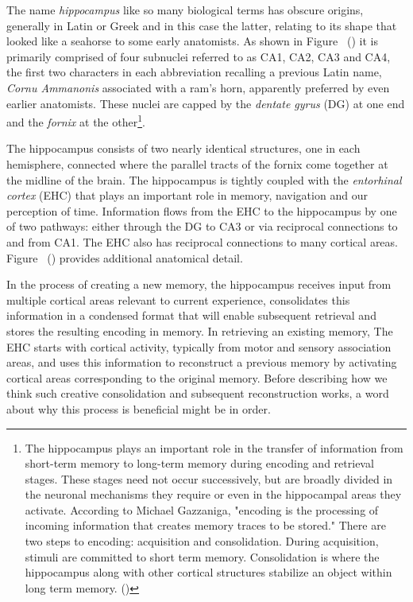 The name {\it{hippocampus}} like so many biological terms has obscure origins, generally in Latin or Greek and in this case the latter, relating to its shape that looked like a seahorse to some early anatomists. As shown in Figure~{} ({}) it is primarily comprised of four subnuclei referred to as CA1, CA2, CA3 and CA4, the first two characters in each abbreviation recalling a previous Latin name, {\it{Cornu Ammanonis}} associated with a ram's horn, apparently preferred by even earlier anatomists. These nuclei are capped by the {\it{dentate gyrus}} (DG) at one end and the {\it{fornix}} at the other\footnote{%
%
  The hippocampus plays an important role in the transfer of information from short-term memory to long-term memory during encoding and retrieval stages. These stages need not occur successively, but are broadly divided in the neuronal mechanisms they require or even in the hippocampal areas they activate. According to Michael Gazzaniga, "encoding is the processing of incoming information that creates memory traces to be stored." There are two steps to encoding: acquisition and consolidation. During acquisition, stimuli are committed to short term memory. Consolidation is where the hippocampus along with other cortical structures stabilize an object within long term memory. ({})}. 

The hippocampus consists of two nearly identical structures, one in each hemisphere, connected where the parallel tracts of the fornix come together at the midline of the brain. The hippocampus is tightly coupled with the {\it{entorhinal cortex}} (EHC) that plays an important role in memory, navigation and our perception of time. Information flows from the EHC to the hippocampus by one of two pathways: either through the DG to CA3 or via reciprocal connections to and from CA1. The EHC also has reciprocal connections to many cortical areas. Figure~{} ({}) provides additional anatomical detail. 

In the process of creating a new memory, the hippocampus receives input from multiple cortical areas relevant to current experience, consolidates this information in a condensed format that will enable subsequent retrieval and stores the resulting encoding in memory. In retrieving an existing memory, The EHC starts with cortical activity, typically from motor and sensory association areas, and uses this information to reconstruct a previous memory by activating cortical areas corresponding to the original memory. Before describing how we think such creative consolidation and subsequent reconstruction works, a word about why this process is beneficial might be in order.

